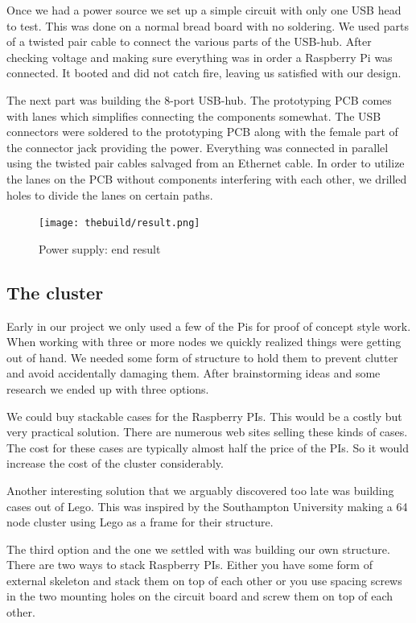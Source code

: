 Once we had a power source we set up a simple circuit with only one USB head to test. This was done on a normal bread board with no soldering. We used parts of a twisted pair cable to connect the various parts of the USB-hub. After checking voltage and making sure everything was in order a Raspberry Pi was connected. It booted and did not catch fire, leaving us satisfied with our design. 

The next part was building the 8-port USB-hub. The prototyping PCB comes with lanes which simplifies connecting the components somewhat. The USB connectors were soldered to the prototyping PCB along with the female part of the connector jack providing the power. Everything was connected in parallel using the twisted pair cables salvaged from an Ethernet cable. In order to utilize the lanes on the PCB without components interfering with each other, we drilled holes to divide the lanes on certain paths.   

\begin{figure}[h]
	\centering
    \texttt{[image: thebuild/result.png]}
    \caption{Power supply: end result}
    \label{fig:build_power_supply}
\end{figure}

\subsection{The cluster}
Early in our project we only used a few of the Pis for proof of concept style work. When working with three or more nodes we quickly realized things were getting out of hand. We needed some form of structure to hold them to prevent clutter and avoid accidentally damaging them. After brainstorming ideas and some research we ended up with three options. 

We could buy stackable cases for the Raspberry PIs. This would be a costly but very practical solution. There are numerous web sites selling these kinds of cases. The cost for these cases are typically almost half the price of the PIs. So it would increase the cost of the cluster considerably.

Another interesting solution that we arguably discovered too late was building cases out of Lego. This was inspired by the Southampton University making a 64 node cluster using Lego as a frame for their structure.\cite{legos} 

The third option and the one we settled with was building our own structure. There are two ways to stack Raspberry PIs. Either you have some form of external skeleton and stack them on top of each other or you use spacing screws in the two mounting holes on the circuit board and screw them on top of each other. 

